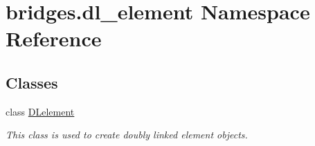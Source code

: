 \hypertarget{namespacebridges_1_1dl__element}{}\section{bridges.\+dl\+\_\+element Namespace Reference}
\label{namespacebridges_1_1dl__element}
\subsection*{Classes}
\begin{DoxyCompactItemize}
\item 
class \hyperlink{classbridges_1_1dl__element_1_1_d_lelement}{D\+Lelement}
\begin{DoxyCompactList}\small\item\em This class is used to create doubly linked element objects. \end{DoxyCompactList}\end{DoxyCompactItemize}
